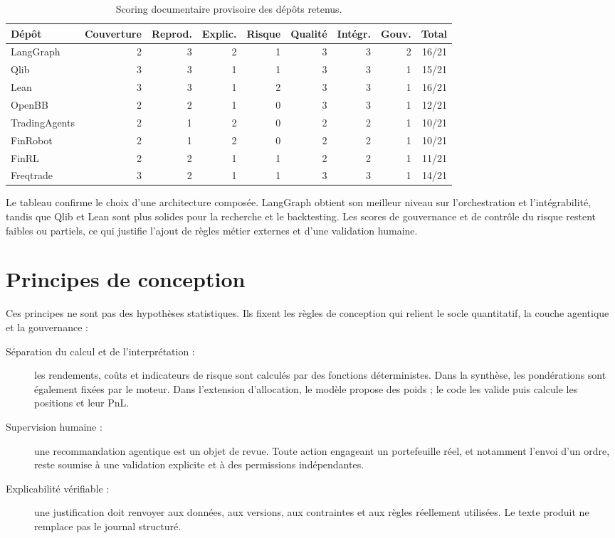 \begin{table}[H]
\centering
\caption{Scoring documentaire provisoire des dépôts retenus.}
\label{tab:scoring-depots}
\scriptsize
\begin{adjustbox}{width=\textwidth}
\begin{tabular}{lrrrrrrrr}
\toprule
\textbf{Dépôt} & \textbf{Couverture} & \textbf{Reprod.} & \textbf{Explic.} & \textbf{Risque} & \textbf{Qualité} & \textbf{Intégr.} & \textbf{Gouv.} & \textbf{Total} \\
\midrule
LangGraph & 2 & 3 & 2 & 1 & 3 & 3 & 2 & 16/21 \\
Qlib & 3 & 3 & 1 & 1 & 3 & 3 & 1 & 15/21 \\
Lean & 3 & 3 & 1 & 2 & 3 & 3 & 1 & 16/21 \\
OpenBB & 2 & 2 & 1 & 0 & 3 & 3 & 1 & 12/21 \\
TradingAgents & 2 & 1 & 2 & 0 & 2 & 2 & 1 & 10/21 \\
FinRobot & 2 & 1 & 2 & 0 & 2 & 2 & 1 & 10/21 \\
FinRL & 2 & 2 & 1 & 1 & 2 & 2 & 1 & 11/21 \\
Freqtrade & 3 & 2 & 1 & 1 & 3 & 3 & 1 & 14/21 \\
\bottomrule
\end{tabular}
\end{adjustbox}
\end{table}

Le tableau confirme le choix d'une architecture composée. LangGraph obtient son meilleur niveau sur l'orchestration et l'intégrabilité, tandis que Qlib et Lean sont plus solides pour la recherche et le backtesting. Les scores de gouvernance et de contrôle du risque restent faibles ou partiels, ce qui justifie l'ajout de règles métier externes et d'une validation humaine.

\section{Principes de conception}

Ces principes ne sont pas des hypothèses statistiques. Ils fixent les règles de conception qui relient le socle quantitatif, la couche agentique et la gouvernance :

\begin{description}
    \item[Séparation du calcul et de l'interprétation :] les rendements, coûts et indicateurs de risque sont calculés par des fonctions déterministes. Dans la synthèse, les pondérations sont également fixées par le moteur. Dans l'extension d'allocation, le modèle propose des poids ; le code les valide puis calcule les positions et leur PnL.
    \item[Supervision humaine :] une recommandation agentique est un objet de revue. Toute action engageant un portefeuille réel, et notamment l'envoi d'un ordre, reste soumise à une validation explicite et à des permissions indépendantes.
    \item[Explicabilité vérifiable :] une justification doit renvoyer aux données, aux versions, aux contraintes et aux règles réellement utilisées. Le texte produit ne remplace pas le journal structuré.
\end{description}

